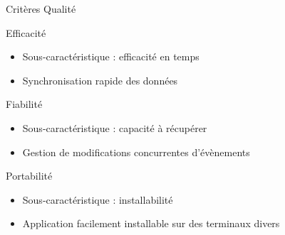 \begin{frame}{Critères Qualité}
      \begin{block}{Efficacité}
       \begin{itemize}
        \item Sous-caractéristique : efficacité en temps
        \item Synchronisation rapide des données
       \end{itemize}
      \end{block}
      \begin{block}{Fiabilité}
       \begin{itemize}
        \item Sous-caractéristique : capacité à récupérer
        \item Gestion de modifications concurrentes d'évènements
       \end{itemize}
      \end{block}
      \begin{block}{Portabilité}
       \begin{itemize}
        \item Sous-caractéristique : installabilité
        \item Application facilement installable sur des terminaux divers
       \end{itemize}
      \end{block}
\end{frame}
